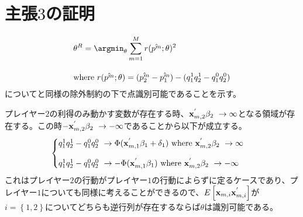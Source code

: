 \chapter{主張$3$の証明}
\begin{align*}
	&\theta^R = \argmin_{\theta} \sum_{m = 1}^M r(\hat{p^m} ; \theta)^2\\[10pt]
	&\text{where}\ r(\hat{p^m} ; \theta) = (\hat{p_2^m} - \hat{p_1^m}) - (q_1^1 q_2^1 - q_1^0 q_2^0)
\end{align*}
について\cite{Tamer2003a}と同様の除外制約の下で点識別可能であることを示す。

プレイヤー$2$の利得のみ動かす変数が存在する時、${\bf x}_{m, 2}^{'} \beta_2\ \to \infty$となる領域が存在する。この時$-{\bf x}_{m, 2}^{'} \beta_2\ \to -\infty$であることから以下が成立する。
\begin{align*}
\begin{cases}
	q_1^1 q_2^1 - q_1^0 q_2^0\ \to \Phi({\bf x}_{m, 1}^{'} \beta_1 + \delta_1)\ \text{where}\ {\bf x}_{m, 2}^{'} \beta_2\ \to \infty\\[10pt]
	q_1^1 q_2^1 - q_1^0 q_2^0\ \to -\Phi({\bf x}_{m, 1}^{'} \beta_1)\ \text{where}\ {\bf x}_{m, 2}^{'} \beta_2\ \to -\infty
\end{cases}
\end{align*}
これはプレイヤー$2$の行動がプレイヤー$1$の行動によらずに定るケースであり、プレイヤー$1$についても同様に考えることができるので、$E\left[ {\bf x}_{m, i} {\bf x}_{m, i}^{'} \right]$が$i = \left\{ 1,2 \right\}$についてどちらも逆行列が存在するならば$\theta$は識別可能である。